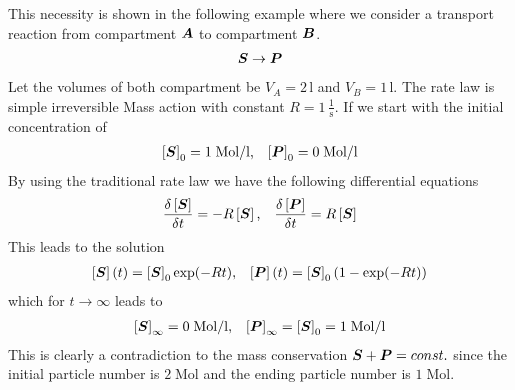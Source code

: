 \documentclass[12pt,english]{article}
\newcommand{\boldsymbol}[1]{\mbox{\boldmath $#1$}}
\begin{document}
This necessity is shown in the following example where we consider a
transport reaction from compartment $\boldsymbol{A}$ to compartment
$\boldsymbol{B}$. 
%
\begin{eqnarray}
\boldsymbol{S} \rightarrow \boldsymbol{P}
\end{eqnarray} 
%
Let the volumes of both compartment be $V_A = 2\, \mbox{l}$ and $V_B =
1\, \mbox{l}$. The rate law is simple irreversible Mass action with
constant $R = 1\, \frac{1}{\mbox{s}}$.  If we start with the initial
concentration of
%
\begin{eqnarray}
\left[\boldsymbol{S}\right]_0 = 1\; \mbox{Mol/l}
\mbox{,} &&
\left[\boldsymbol{P}\right]_0 = 0\; \mbox{Mol/l}
\end{eqnarray} 
%
By using the traditional rate law we have the following differential
equations 
%
\begin{eqnarray}
\frac{\delta \left[\boldsymbol{S}\right]}{\delta t} 
= - R \left[\boldsymbol{S}\right]
\mbox{,} &&
\frac{\delta \left[\boldsymbol{P}\right]}{\delta t} 
=   R \left[\boldsymbol{S}\right] 
\end{eqnarray} 
%
This leads to the solution
%
\begin{eqnarray}
\left[\boldsymbol{S}\right](t) = \left[\boldsymbol{S}\right]_0 \exp(-Rt)
\mbox{,} &&
\left[\boldsymbol{P}\right](t) = \left[\boldsymbol{S}\right]_0
(1 - \exp(-Rt))
\end{eqnarray} 
%
which for $t \rightarrow \infty$ leads to 
%
\begin{eqnarray}
\left[\boldsymbol{S}\right]_\infty = 0\; \mbox{Mol/l}
\mbox{,} &&
\left[\boldsymbol{P}\right]_\infty = \left[\boldsymbol{S}\right]_0 = 1\; \mbox{Mol/l} 
\end{eqnarray} 
%
This is clearly a contradiction to the mass conservation
$\boldsymbol{S} + \boldsymbol{P} = const.$ since the initial particle
number is $2\; \mbox{Mol}$ and the ending particle number is $1\;
\mbox{Mol}$.
\end{document}
